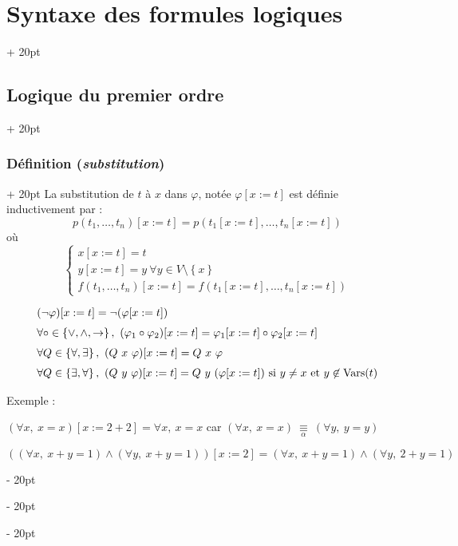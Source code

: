 \documentclass[a4paper, 12pt, twoside]{article}
\newcommand{\set}[1]{\left\{ #1 \right\}}
\newcommand{\ind}[1][20pt]{\advance\leftskip + #1}
\newcommand{\deind}[1][20pt]{\advance\leftskip - #1}
\newenvironment{indt}[2][20pt]{#2 \par \ind[#1]}{\par \deind} %
\begin{document}
\begin{indt}{\section{Syntaxe des formules logiques}}
\begin{indt}{\subsection{Logique du premier ordre}}
\begin{indt}{\subsubsection{Définition (\textit{substitution})}}
                La substitution de $t$ à $x$ dans $\varphi$, notée $\varphi [x := t]$ est définie inductivement par :
                    \[
                        p(t_1, \ldots, t_n) [x := t] = p(t_1[x := t], \ldots, t_n [x := t])
                    \]
                où
                    \[
                        \begin{cases}
                            x [x := t] = t
                            \\
                            y [x := t] = y\ \forall y \in V \setminus \set x
                            \\
                            f(t_1, \ldots, t_n) [x := t] = f(t_1 [x := t], \ldots, t_n [x := t])
                        \end{cases}
                    \]
                    
                    \[
                        \begin{array}{l}
                            (\neg \varphi) [x := t] = \neg (\varphi [x := t])
                            \vspace{6pt}
                            \\
                            \forall \circ \in \set{\vee, \wedge, \rightarrow},\ (\varphi_1 \circ \varphi_2) [x := t] = \varphi_1[x := t] \circ \varphi_2 [x := t]
                            \vspace{6pt}
                            \\
                            \forall Q \in \set{\forall, \exists},\ (Q\ x\ \varphi)[x := t] = Q\ x\ \varphi
                            \vspace{6pt}
                            \\
                            \forall Q \in \set{\exists, \forall},\ (Q\ y\ \varphi)[x := t] = Q\ y\ (\varphi [x := t])\ \text{si $y \neq x$ et $y \not \in \mathrm{Vars}(t)$}
                        \end{array}
                    \]
                
                Exemple :
                
                $(\forall x,\ x = x)[x := 2 + 2] = \forall x,\ x = x$
                car
                $(\forall x,\ x = x)\ \underset{\alpha}{\equiv} \ (\forall y,\ y = y)$
                
                \vspace{6pt}
                
                $((\forall x,\ x + y = 1) \wedge (\forall y, \ x + y = 1))[x := 2] = (\forall x,\ x + y = 1) \wedge (\forall y,\ 2 + y = 1)$
                

\end{indt}
\end{indt}
\end{indt}
\end{document}
